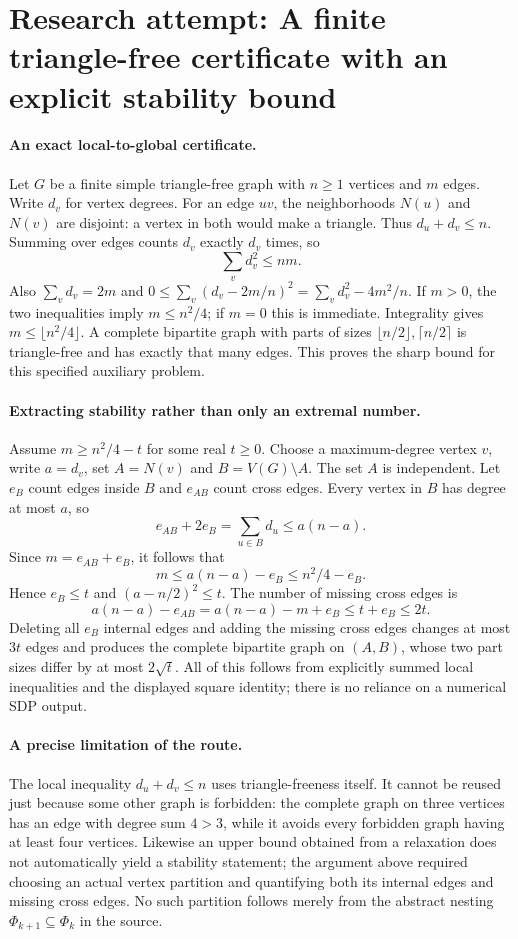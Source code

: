 \documentclass[11pt]{article}
\begin{document}
\section{Research attempt: A finite triangle-free certificate with an explicit stability bound}

\paragraph{An exact local-to-global certificate.}
Let $G$ be a finite simple triangle-free graph with $n\geq1$ vertices and $m$
edges. Write $d_v$ for vertex degrees. For an edge $uv$, the neighborhoods
$N(u)$ and $N(v)$ are disjoint: a vertex in both would make a triangle.
Thus $d_u+d_v\leq n$. Summing over edges counts $d_v$ exactly $d_v$ times,
so
\[
 \sum_v d_v^2\leq nm.
\]
Also $\sum_vd_v=2m$ and
$0\leq\sum_v(d_v-2m/n)^2=\sum_vd_v^2-4m^2/n$.
If $m>0$, the two inequalities imply $m\leq n^2/4$; if $m=0$ this is immediate.
Integrality gives $m\leq\lfloor n^2/4\rfloor$. A complete bipartite graph
with parts of sizes $\lfloor n/2\rfloor,\lceil n/2\rceil$ is triangle-free
and has exactly that many edges. This proves the sharp bound for this
specified auxiliary problem.

\paragraph{Extracting stability rather than only an extremal number.}
Assume $m\geq n^2/4-t$ for some real $t\geq0$. Choose a maximum-degree
vertex $v$, write $a=d_v$, set $A=N(v)$ and $B=V(G)\setminus A$.
The set $A$ is independent. Let $e_B$ count edges inside $B$ and $e_{AB}$
count cross edges. Every vertex in $B$ has degree at most $a$, so
\[
 e_{AB}+2e_B=\sum_{u\in B}d_u\leq a(n-a).
\]
Since $m=e_{AB}+e_B$, it follows that
\[
 m\leq a(n-a)-e_B\leq n^2/4-e_B.
\]
Hence $e_B\leq t$ and $(a-n/2)^2\leq t$.
The number of missing cross edges is
\[
 a(n-a)-e_{AB}=a(n-a)-m+e_B\leq t+e_B\leq2t.
\]
Deleting all $e_B$ internal edges and adding the missing cross edges changes
at most $3t$ edges and produces the complete bipartite graph on $(A,B)$,
whose two part sizes differ by at most $2\sqrt t$.
All of this follows from explicitly summed local inequalities and the displayed
square identity; there is no reliance on a numerical SDP output.

\paragraph{A precise limitation of the route.}
The local inequality $d_u+d_v\leq n$ uses triangle-freeness itself. It cannot
be reused just because some other graph is forbidden: the complete graph on
three vertices has an edge with degree sum $4>3$, while it avoids every
forbidden graph having at least four vertices. Likewise an upper bound obtained
from a relaxation does not automatically yield a stability statement; the
argument above required choosing an actual vertex partition and quantifying
both its internal edges and missing cross edges. No such partition follows
merely from the abstract nesting $\Phi_{k+1}\subseteq\Phi_k$ in the source.
\end{document}

